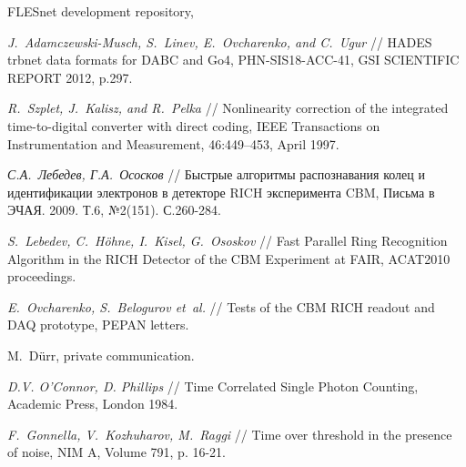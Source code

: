 \begin{thebibliography}{99}


FLESnet development repository,

\textit{J.~Adamczewski-Musch, S.~Linev, E.~Ovcharenko, and C.~Ugur} //
HADES trbnet data formats for DABC and Go4,
PHN-SIS18-ACC-41, GSI SCIENTIFIC REPORT 2012, p.297.

\textit{R.~Szplet, J.~Kalisz, and R.~Pelka} //
Nonlinearity correction of the integrated time-to-digital converter with direct coding,
IEEE Transactions on Instrumentation and Measurement, 46:449–453, April 1997.

\textit{С.А.~Лебедев, Г.А.~Ососков} //
Быстрые алгоритмы распознавания колец и идентификации электронов в детекторе RICH эксперимента CBM,
Письма в ЭЧАЯ. 2009. Т.6, №2(151). С.260-284.

\textit{S.~Lebedev, C.~H\"{o}hne, I.~Kisel, G.~Ososkov} //
Fast Parallel Ring Recognition Algorithm in the RICH Detector of the CBM Experiment at FAIR,
ACAT2010 proceedings.

\textit{E.~Ovcharenko, S.~Belogurov et~al.} //
Tests of the CBM RICH readout and DAQ prototype,
PEPAN letters.

M.~D\"urr, private communication.

\textit{D.V. O’Connor, D. Phillips} //
Time Correlated Single Photon Counting, Academic Press, London 1984.

\textit{F.~Gonnella, V.~Kozhuharov, M.~Raggi} //
Time over threshold in the presence of noise,
NIM A, Volume 791, p. 16-21.

\end{thebibliography}

